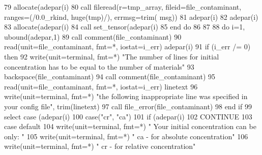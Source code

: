 \begin{DoxyCode}
79         \textcolor{keyword}{allocate}(adepar(i)%
80         \textcolor{keyword}{call }fileread(r=tmp\_array, fileid=file_contaminant, ranges=(/0.0\_rkind,\textcolor{comment}{ huge(tmp)/), errmsg=trim(
      msg))}
81 \textcolor{comment}{        adepar(i)%
82 \textcolor{comment}{        adepar(i)%
83 \textcolor{comment}{        }\textcolor{keyword}{allocate}(adepar(i)%
84         \textcolor{keyword}{call }set_tensor(adepar(i)%
85 \textcolor{comment}{}\textcolor{keywordflow}{      end do}
86       
87       
88       \textcolor{keywordflow}{do} i=1, ubound(adepar,1)
89        \textcolor{keyword}{call }comment(file_contaminant)
90        \textcolor{keyword}{read}(unit=file_contaminant, fmt=*, iostat=i\_err) adepar(i)%
91 \textcolor{comment}{       }\textcolor{keywordflow}{if} (i\_err /= 0) \textcolor{keywordflow}{then}
92          \textcolor{keyword}{write}(unit=terminal, fmt=*) \textcolor{stringliteral}{"The number of lines for initial concentration has to be equal to the
       number of materials"}
93          backspace(file_contaminant)
94          \textcolor{keyword}{call }comment(file_contaminant)
95          \textcolor{keyword}{read}(unit=file_contaminant, fmt=*, iostat=i\_err) linetext
96          \textcolor{keyword}{write}(unit=terminal, fmt=*) \textcolor{stringliteral}{"the following inappropriate line was specified in your config file"}\textcolor{comment}{, 
      trim(linetext)}
97 \textcolor{comment}{         }\textcolor{keyword}{call }file_error(file_contaminant)   
98 \textcolor{keywordflow}{       end if}
99        \textcolor{keywordflow}{select case} (adepar(i)%
100          \textcolor{keywordflow}{case}(\textcolor{stringliteral}{"cr"}, \textcolor{stringliteral}{"ca"})
101            \textcolor{keywordflow}{if} (adepar(i)%
102            \textcolor{keywordflow}{CONTINUE}
103 \textcolor{keywordflow}{         case default}
104            \textcolor{keyword}{write}(unit=terminal, fmt=*) \textcolor{stringliteral}{" Your initial concentration can be only:  "}
105            \textcolor{keyword}{write}(unit=terminal, fmt=*) \textcolor{stringliteral}{"  ca - for absolute concentration"}
106            \textcolor{keyword}{write}(unit=terminal, fmt=*) \textcolor{stringliteral}{"  cr - for relative concentration"}
}}
\end{DoxyCode}
